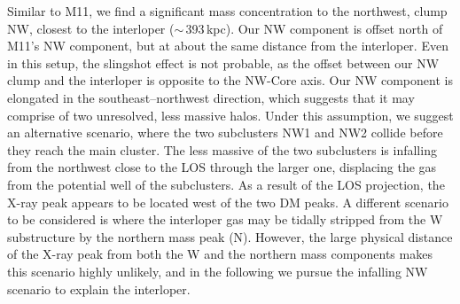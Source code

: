 \documentclass[iop,twocolumn]{emulateapj}
\begin{document}
Similar to M11, we find a significant mass concentration to the
northwest, clump NW, closest to the interloper ($\sim\,$393\,kpc).  
Our NW component is offset north of M11's NW component, but at about the same distance from the interloper.  
Even in this setup, the slingshot effect is not probable, as the offset between our NW clump and the interloper is opposite to the NW-Core axis. 
%
Our NW component is elongated in the southeast--northwest
direction, which suggests that it may comprise of two unresolved, 
less massive halos. Under this assumption, we suggest an 
alternative scenario, where the two subclusters NW1 and NW2 collide before they reach the main cluster. The less massive of the two subclusters is infalling from the northwest close to the LOS through the larger one, displacing the gas from the potential well of the subclusters. As a result of the LOS projection, the X-ray peak appears to be located  west of the two DM peaks.
%
A different scenario to be considered is where the interloper gas may be tidally stripped from the W substructure by the northern mass peak (N). However, the large
physical distance of the X-ray peak from both the W and the northern mass components makes this scenario highly unlikely, and in the following we pursue the infalling NW scenario to explain the interloper.
\end{document}
